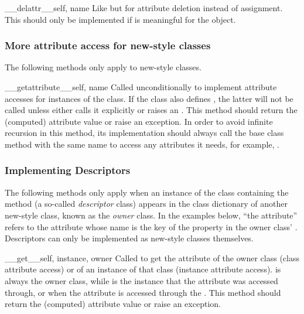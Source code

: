 \begin{methoddesc}[object]{__delattr__}{self, name}
Like  but for attribute deletion instead of
assignment.  This should only be implemented if  is meaningful for the object.
\end{methoddesc}

\subsubsection{More attribute access for new-style classes \label{new-style-attribute-access}}

The following methods only apply to new-style classes.

\begin{methoddesc}[object]{__getattribute__}{self, name}
Called unconditionally to implement attribute accesses for instances
of the class. If the class also defines , the latter 
will not be called unless  either calls it 
explicitly or raises an .
This method should return the (computed) attribute
value or raise an  exception.
In order to avoid infinite recursion in this method, its
implementation should always call the base class method with the same
name to access any attributes it needs, for example,
.
\end{methoddesc}

\subsubsection{Implementing Descriptors \label{descriptors}}

The following methods only apply when an instance of the class
containing the method (a so-called \emph{descriptor} class) appears in
the class dictionary of another new-style class, known as the
\emph{owner} class. In the examples below, ``the attribute'' refers to
the attribute whose name is the key of the property in the owner
class' .  Descriptors can only be implemented as
new-style classes themselves.

\begin{methoddesc}[object]{__get__}{self, instance, owner}
Called to get the attribute of the owner class (class attribute access)
or of an instance of that class (instance attribute access).
 is always the owner class, while  is the
instance that the attribute was accessed through, or  when
the attribute is accessed through the .  This method should
return the (computed) attribute value or raise an
 exception.
\end{methoddesc}


